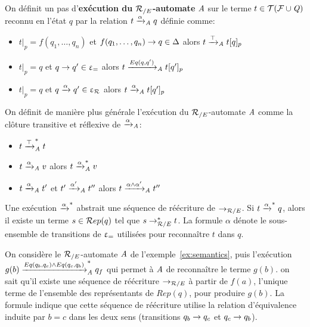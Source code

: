
\begin{definition}
  \label{def:xrw_alpha}
  On définit un pas d'\textbf{exécution du ${\mathcal R_{/E}}$-automate} $\mathit A$ sur le terme $t \in \mathcal{ T(F \cup \mathit Q)}$ reconnu en l'état $q$ 
  par la relation $t \xrightarrow{\alpha}_\mathit A q$ définie comme:
  \begin{itemize}
  \item $t|_p = f(q_1, \dots, q_n)$ et $f(q_1, \dots, q_n) \rightarrow q \in \Delta$
    alors $t \xrightarrow{\top}_\mathit A t[q]_p$
  \item $t|_p = q$ et $q \rightarrow q' \in \upvarepsilon_{=}$ alors $t \xrightarrow{Eq(q, q')}_\mathit A t[q']_p$
  \item $t|_p = q$ et $q \xrightarrow{\alpha} q' \in \upvarepsilon_{\mathcal R}$ alors $t \xrightarrow{\alpha}_\mathit A t[q']_p$ 
  \end{itemize}
  On définit de manière plus générale l'exécution du ${\mathcal R_{/E}}$-automate $\mathit A$ comme la clôture 
  transitive et réflexive de $\xrightarrow{\alpha}_\mathit A$:
  \begin{itemize}
  \item $t \xrightarrow{\top}_\mathit A^* t$
  \item $t \xrightarrow{\alpha}_\mathit A v$ alors $t \xrightarrow{\alpha}^*_\mathit A v$
  \item $t \xrightarrow{\alpha}_\mathit A t'$ et  $t' \xrightarrow{\alpha'}_\mathit A t''$ alors $t \xrightarrow{\alpha \land \alpha'}_\mathit A t''$
  \end{itemize}
\end{definition}

\noindent
Une exécution $\xrightarrow{\alpha}^*$ abstrait une séquence de réécriture de $\rightarrow_{\mathcal R/E}$. Si $t
\xrightarrow{\alpha}^* q$, alors il existe un terme $s\in \mathcal R ep(q)$ tel que 
$s\rightarrow_{\mathcal R/E}^* t$. La formule $\alpha$ dénote le sous-ensemble de transitions de $\upvarepsilon_{=}$ 
utilisées pour reconnaître $t$ dans $q$.


\begin{example}
  On considère le ${\mathcal R_{/E}}$-automate $\mathit A$ de l'exemple~\ref{ex:semantics}, puis l'exécution
  $g(b) \xrightarrow{Eq(q_b, q_c) \land Eq (q_c, q_b)}^*_\mathit A q_f$ qui permet à $\mathit A$ de reconnaître le terme $g(b)$.
  on sait qu'il existe une séquence de réécriture $\rightarrow_{\mathcal R/E}$ à partir de $f(a)$, l'unique terme
  de l'ensemble des représentants de $Rep(q)$, pour produire $g(b)$. 
  La formule indique que cette séquence de réécriture utilise 
  la relation d'équivalence  induite par $b = c$ dans les deux sens
  (transitions $q_b \rightarrow q_c$ et $q_c \rightarrow q_b$).
\end{example}


